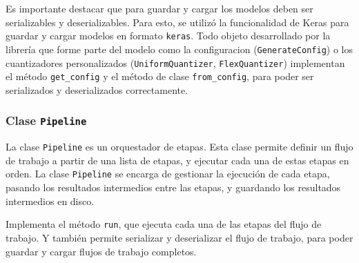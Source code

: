 
Es importante destacar que para guardar y cargar los modelos deben ser serializables y deserializables. Para esto, se utiliz\'o la funcionalidad de Keras para guardar y cargar modelos en formato \texttt{keras}. Todo objeto desarrollado por la librería que forme parte del modelo como la configuracion (\texttt{GenerateConfig}) o los cuantizadores personalizados (\texttt{UniformQuantizer}, \texttt{FlexQuantizer}) implementan el método \texttt{get\_config} y el método de clase \texttt{from\_config}, para poder ser serializados y deserializados correctamente.

\subsubsection{Clase \texttt{Pipeline}}

La clase \texttt{Pipeline} es un orquestador de etapas. Esta clase permite definir un flujo de trabajo a partir de una lista de etapas, y ejecutar cada una de estas etapas en orden. La clase \texttt{Pipeline} se encarga de gestionar la ejecución de cada etapa, pasando los resultados intermedios entre las etapas, y guardando los resultados intermedios en disco.

Implementa el método \texttt{run}, que ejecuta cada una de las etapas del flujo de trabajo. Y también permite serializar y deserializar el flujo de trabajo, para poder guardar y cargar flujos de trabajo completos.
